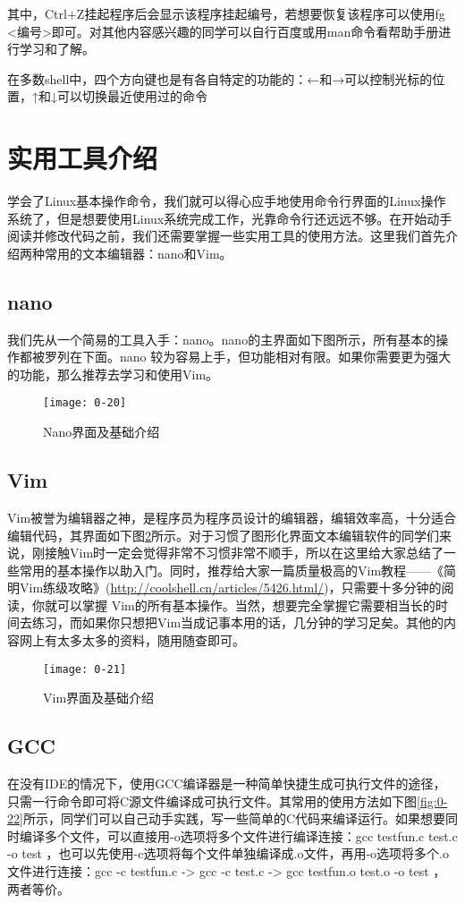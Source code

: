其中，Ctrl+Z挂起程序后会显示该程序挂起编号，若想要恢复该程序可以使用fg <编号>即可。对其他内容感兴趣的同学可以自行百度或用man命令看帮助手册进行学习和了解。

\begin{note}
在多数shell中，四个方向键也是有各自特定的功能的：←和→可以控制光标的位置，↑和↓可以切换最近使用过的命令
\end{note}

\section{实用工具介绍}
学会了Linux基本操作命令，我们就可以得心应手地使用命令行界面的Linux操作系统了，但是想要使用Linux系统完成工作，光靠命令行还远远不够。在开始动手阅读并修改代码之前，我们还需要掌握一些实用工具的使用方法。这里我们首先介绍两种常用的文本编辑器：nano和Vim。
\subsection{nano}
我们先从一个简易的工具入手：nano。nano的主界面如下图所示，所有基本的操作都被罗列在下面。nano 较为容易上手，但功能相对有限。如果你需要更为强大的功能，那么推荐去学习和使用Vim。

\begin{figure}[htbp]
  \centering
  \texttt{[image: 0-20]}
  \caption{Nano界面及基础介绍}\label{fig:0-20}
\end{figure}

\subsection{Vim}
Vim被誉为编辑器之神，是程序员为程序员设计的编辑器，编辑效率高，十分适合编辑代码，其界面如下图\ref{fig:0-21}所示。对于习惯了图形化界面文本编辑软件的同学们来说，刚接触Vim时一定会觉得非常不习惯非常不顺手，所以在这里给大家总结了一些常用的基本操作以助入门。同时，推荐给大家一篇质量极高的Vim教程——《简明Vim练级攻略》(\url{http://coolshell.cn/articles/5426.html/})，只需要十多分钟的阅读，你就可以掌握 Vim的所有基本操作。当然，想要完全掌握它需要相当长的时间去练习，而如果你只想把Vim当成记事本用的话，几分钟的学习足矣。其他的内容网上有太多太多的资料，随用随查即可。

\begin{figure}[htbp]
  \centering
  \texttt{[image: 0-21]}
  \caption{Vim界面及基础介绍}\label{fig:0-21}
\end{figure}

\subsection{GCC}
在没有IDE的情况下，使用GCC编译器是一种简单快捷生成可执行文件的途径，只需一行命令即可将C源文件编译成可执行文件。其常用的使用方法如下图\ref{fig:0-22}所示，同学们可以自己动手实践，写一些简单的C代码来编译运行。如果想要同时编译多个文件，可以直接用-o选项将多个文件进行编译连接：gcc testfun.c test.c -o test ，也可以先使用-c选项将每个文件单独编译成.o文件，再用-o选项将多个.o文件进行连接：gcc -c testfun.c -> gcc -c test.c -> gcc testfun.o test.o -o test ，两者等价。

